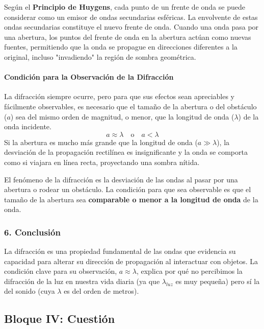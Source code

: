 Según el \textbf{Principio de Huygens}, cada punto de un frente de onda se puede considerar como un emisor de ondas secundarias esféricas. La envolvente de estas ondas secundarias constituye el nuevo frente de onda. Cuando una onda pasa por una abertura, los puntos del frente de onda en la abertura actúan como nuevas fuentes, permitiendo que la onda se propague en direcciones diferentes a la original, incluso "invadiendo" la región de sombra geométrica.

\paragraph{Condición para la Observación de la Difracción}
La difracción siempre ocurre, pero para que sus efectos sean apreciables y fácilmente observables, es necesario que el tamaño de la abertura o del obstáculo ($a$) sea del mismo orden de magnitud, o menor, que la longitud de onda ($\lambda$) de la onda incidente.
$$ a \approx \lambda \quad \text{o} \quad a < \lambda $$
Si la abertura es mucho más grande que la longitud de onda ($a \gg \lambda$), la desviación de la propagación rectilínea es insignificante y la onda se comporta como si viajara en línea recta, proyectando una sombra nítida.

\begin{cajaresultado}
El fenómeno de la difracción es la desviación de las ondas al pasar por una abertura o rodear un obstáculo. La condición para que sea observable es que el tamaño de la abertura sea \textbf{comparable o menor a la longitud de onda} de la onda.
\end{cajaresultado}

\subsubsection*{6. Conclusión}
\begin{cajaconclusion}
La difracción es una propiedad fundamental de las ondas que evidencia su capacidad para alterar su dirección de propagación al interactuar con objetos. La condición clave para su observación, $a \approx \lambda$, explica por qué no percibimos la difracción de la luz en nuestra vida diaria (ya que $\lambda_{luz}$ es muy pequeña) pero sí la del sonido (cuya $\lambda$ es del orden de metros).
\end{cajaconclusion}

\newpage

\subsection{Bloque IV: Cuestión}
\label{subsec:A4_2011_jun_ord}

